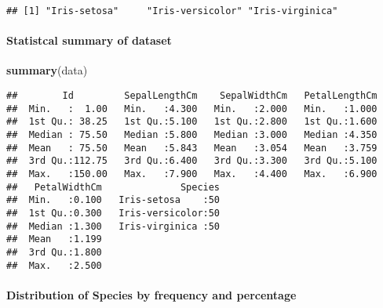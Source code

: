 \documentclass[]{article}
\newenvironment{Shaded}{\begin{snugshade}}{\end{snugshade}}
\newcommand{\KeywordTok}[1]{\textcolor[rgb]{0.13,0.29,0.53}{\textbf{#1}}}
\newcommand{\DataTypeTok}[1]{\textcolor[rgb]{0.13,0.29,0.53}{#1}}
\newcommand{\DecValTok}[1]{\textcolor[rgb]{0.00,0.00,0.81}{#1}}
\newcommand{\StringTok}[1]{\textcolor[rgb]{0.31,0.60,0.02}{#1}}
\newcommand{\OperatorTok}[1]{\textcolor[rgb]{0.81,0.36,0.00}{\textbf{#1}}}
\newcommand{\NormalTok}[1]{#1}
\let\oldparagraph\paragraph
\renewcommand{\paragraph}[1]{\oldparagraph{#1}\mbox{}}
\begin{document}
\begin{Shaded}
\end{Shaded}

\begin{verbatim}
## [1] "Iris-setosa"     "Iris-versicolor" "Iris-virginica"
\end{verbatim}

\paragraph{Statistcal summary of
dataset}\label{statistcal-summary-of-dataset}

\begin{Shaded}
\begin{Highlighting}[]
\KeywordTok{summary}\NormalTok{(data)}
\end{Highlighting}
\end{Shaded}

\begin{verbatim}
##        Id         SepalLengthCm    SepalWidthCm   PetalLengthCm  
##  Min.   :  1.00   Min.   :4.300   Min.   :2.000   Min.   :1.000  
##  1st Qu.: 38.25   1st Qu.:5.100   1st Qu.:2.800   1st Qu.:1.600  
##  Median : 75.50   Median :5.800   Median :3.000   Median :4.350  
##  Mean   : 75.50   Mean   :5.843   Mean   :3.054   Mean   :3.759  
##  3rd Qu.:112.75   3rd Qu.:6.400   3rd Qu.:3.300   3rd Qu.:5.100  
##  Max.   :150.00   Max.   :7.900   Max.   :4.400   Max.   :6.900  
##   PetalWidthCm              Species  
##  Min.   :0.100   Iris-setosa    :50  
##  1st Qu.:0.300   Iris-versicolor:50  
##  Median :1.300   Iris-virginica :50  
##  Mean   :1.199                       
##  3rd Qu.:1.800                       
##  Max.   :2.500
\end{verbatim}

\paragraph{Distribution of Species by frequency and
percentage}\label{distribution-of-species-by-frequency-and-percentage}

\begin{Shaded}
\end{Shaded}
\end{document}
